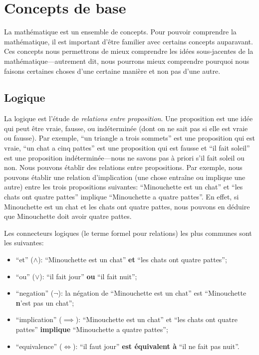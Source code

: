 \chapter{Concepts de base}

La mathématique est un ensemble de concepts. Pour pouvoir comprendre la mathématique, il est important d'être familier avec certains concepts auparavant. Ces concepts nous permettrons de mieux comprendre les idées sous-jacentes de la mathématique---autrement dit, nous pourrons mieux comprendre pourquoi nous faisons certaines choses d'une certaine manière et non pas d'une autre.

\section{Logique}

La logique est l'étude de {\em relations entre proposition}. Une proposition est une idée qui peut être vraie, fausse, ou indéterminée (dont on ne sait pas si elle est vraie ou fausse). Par exemple, ``un triangle a trois sommets'' est une proposition qui est vraie, ``un chat a cinq pattes'' est une proposition qui est fausse et ``il fait soleil'' est une proposition indéterminée---nous ne savons pas à priori s'il fait soleil ou non. Nous pouvons établir des relations entre propositions. Par exemple, nous pouvons établir une relation d'implication (une chose entraîne ou implique une autre) entre les trois propositions suivantes: ``Minouchette est un chat'' et ``les chats ont quatre pattes'' implique ``Minouchette a quatre pattes''. En effet, si Minouchette est un chat et les chats ont quatre pattes, nous pouvons en déduire que Minouchette doit avoir quatre pattes.

Les connecteurs logiques (le terme formel pour relations) les plus communes sont les suivantes:
\begin{itemize}
    \item ``et'' ($\wedge$): ``Minouchette est un chat'' {\bf et} ``les chats ont quatre pattes'';
    \item ``ou'' ($\vee$): ``il fait jour'' {\bf ou} ``il fait nuit'';
    \item ``negation'' ($\neg$): la négation de ``Minouchette est un chat'' est ``Minouchette {\bf n}'est pas un chat'';
    \item ``implication'' ($\implies$): ``Minouchette est un chat'' et ``les chats ont quatre pattes'' {\bf implique} ``Minouchette a quatre pattes'';
    \item ``equivalence'' ($\iff$): ``il faut jour'' {\bf est équivalent à} ``il ne fait pas nuit''.
\end{itemize}


